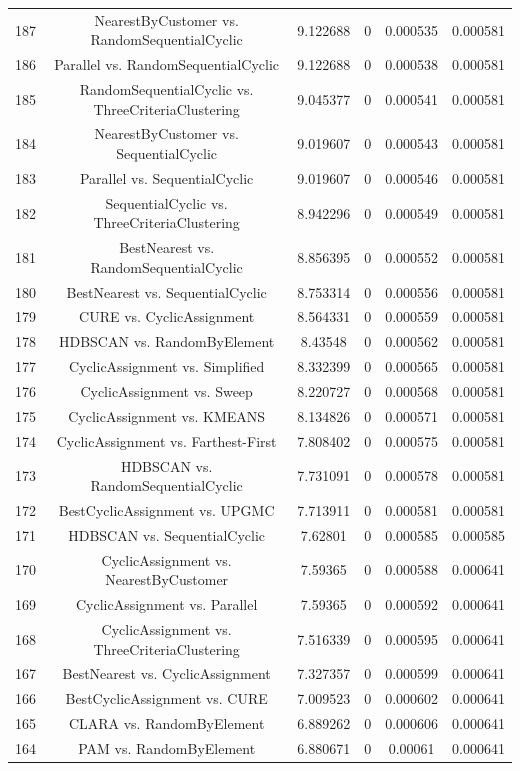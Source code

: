 \documentclass[a4paper,10pt]{article}
\begin{document}
\begin{landscape}
\begin{table}[!htp]
\begin{tabular}{cccccc}
187&NearestByCustomer vs. RandomSequentialCyclic&9.122688&0&0.000535&0.000581\\
186&Parallel vs. RandomSequentialCyclic&9.122688&0&0.000538&0.000581\\
185&RandomSequentialCyclic vs. ThreeCriteriaClustering&9.045377&0&0.000541&0.000581\\
184&NearestByCustomer vs. SequentialCyclic&9.019607&0&0.000543&0.000581\\
183&Parallel vs. SequentialCyclic&9.019607&0&0.000546&0.000581\\
182&SequentialCyclic vs. ThreeCriteriaClustering&8.942296&0&0.000549&0.000581\\
181&BestNearest vs. RandomSequentialCyclic&8.856395&0&0.000552&0.000581\\
180&BestNearest vs. SequentialCyclic&8.753314&0&0.000556&0.000581\\
179&CURE vs. CyclicAssignment&8.564331&0&0.000559&0.000581\\
178&HDBSCAN vs. RandomByElement&8.43548&0&0.000562&0.000581\\
177&CyclicAssignment vs. Simplified&8.332399&0&0.000565&0.000581\\
176&CyclicAssignment vs. Sweep&8.220727&0&0.000568&0.000581\\
175&CyclicAssignment vs. KMEANS&8.134826&0&0.000571&0.000581\\
174&CyclicAssignment vs. Farthest-First&7.808402&0&0.000575&0.000581\\
173&HDBSCAN vs. RandomSequentialCyclic&7.731091&0&0.000578&0.000581\\
172&BestCyclicAssignment vs. UPGMC&7.713911&0&0.000581&0.000581\\
171&HDBSCAN vs. SequentialCyclic&7.62801&0&0.000585&0.000585\\
170&CyclicAssignment vs. NearestByCustomer&7.59365&0&0.000588&0.000641\\
169&CyclicAssignment vs. Parallel&7.59365&0&0.000592&0.000641\\
168&CyclicAssignment vs. ThreeCriteriaClustering&7.516339&0&0.000595&0.000641\\
167&BestNearest vs. CyclicAssignment&7.327357&0&0.000599&0.000641\\
166&BestCyclicAssignment vs. CURE&7.009523&0&0.000602&0.000641\\
165&CLARA vs. RandomByElement&6.889262&0&0.000606&0.000641\\
164&PAM vs. RandomByElement&6.880671&0&0.00061&0.000641\\

\end{tabular}
\end{table}
\end{landscape}
\end{document}
